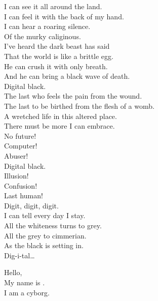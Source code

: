 I can see it all around the land. \\
I can feel it with the back of my hand. \\
I can hear a roaring silence. \\
Of the murky caliginous. \\

I've heard the dark beast has said \\
That the world is like a brittle egg. \\
He can crush it with only breath. \\
And he can bring a black wave of death. \\

Digital black. \\

The last who feels the pain from the wound. \\
The last to be birthed from the flesh of a womb. \\

A wretched life in this altered place. \\
There must be more I can embrace. \\

No future! \\
Computer! \\
Abuser! \\

Digital black. \\

Illusion! \\ 
Confusion! \\
Last human! \\

Digit, digit, digit. \\

I can tell every day I stay. \\
All the whiteness turns to grey. \\
All the grey to cimmerian. \\
As the black is setting in. \\

Dig-i-tal… \\





Hello, \\
My name is . \\
I am a cyborg. \\

